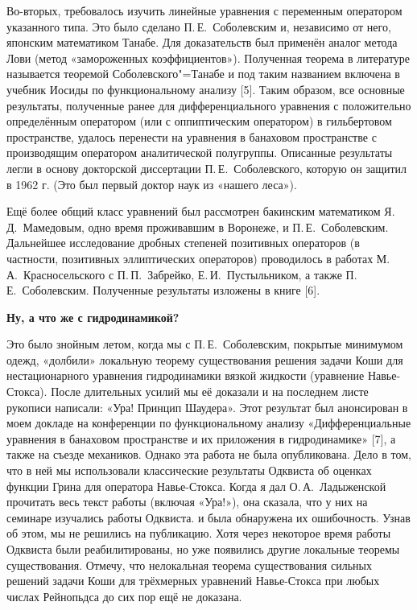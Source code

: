 Во-вторых, требовалось изучить линейные уравнения с переменным оператором указанного типа.
Это было сделано П.\,Е.~Соболевским и, независимо от него, японским математиком Танабе.
Для доказательств был применён аналог метода Лови (метод «замороженных коэффициентов»).
Полученная теорема в литературе называется теоремой Соболевского"=Танабе и под таким названием
включена в учебник Иосиды по функциональному анализу [5].
Таким образом, все основные результаты,
полученные ранее для дифференциального уравнения с положительно определённым оператором (или с оппиптическим оператором)
в гильбертовом пространстве,
удалось перенести на уравнения в банаховом пространстве с производящим оператором аналитической полугруппы. Описанные результаты легли в основу докторской диссертации П.\,Е.~Соболевского, которую он защитил в 1962 г. (Это был первый доктор наук из «нашего леса»).

Ещё более общий класс уравнений был рассмотрен бакинским математиком Я.\,Д.~Мамедовым, одно время проживавшим в Воронеже,
и П.\,Е.~Соболевским. Дальнейшее исследование дробных степеней позитивных операторов
(в частности, позитивных эллиптических операторов) проводилось в работах М.\,А.~Красносельского с П.\,П.~Забрейко, Е.\,И.~Пустыльником, а также П.\,Е.~Соболевским. Полученные результаты изложены в книге [6].

{\bf Ну, а что же с гидродинамикой?}

Это было знойным летом, когда мы с П.\,Е.~Соболевским, покрытые минимумом одежд, «долбили» локальную теорему существования решения задачи Коши для нестационарного уравнения гидродинамики вязкой жидкости (уравнение Навье-Стокса). После длительных усилий мы её доказали и на последнем листе рукописи написали: «Ура! Принцип Шаудера». Этот результат был анонсирован в моем докладе на конференции по функциональному анализу «Дифференциальные уравнения в банаховом пространстве и их приложения в гидродинамике» [7], а также на съезде механиков. Однако эта работа не была опубликована. Дело в том, что в ней мы использовали классические результаты Одквиста об оценках функции Грина для оператора Навье-Стокса. Когда я дал О.\,А.~Ладыженской прочитать весь текст работы (включая «Ура!»), она сказала, что у них на семинаре изучались работы Одквиста. и была обнаружена их ошибочность. Узнав об этом, мы не решились на публикацию. Хотя через некоторое время работы Одквиста были реабилитированы, но уже появились другие локальные теоремы существования. Отмечу, что нелокальная теорема существования сильных решений задачи Коши для трёхмерных уравнений Навье-Стокса при любых числах Рейнопьдса до сих пор ещё не доказана.

